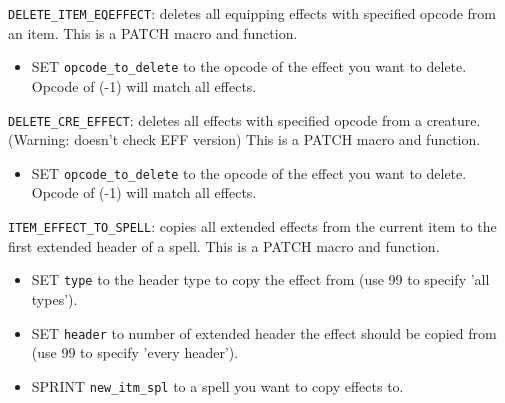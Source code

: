 \documentclass{article}
\begin{document}
\verb+DELETE_ITEM_EQEFFECT+: deletes all equipping effects with specified opcode from an item.
This is a PATCH macro and function.
\begin{itemize}
\item SET \verb+opcode_to_delete+ to the opcode of the effect you want to delete. Opcode of (-1) will match all effects.
\end{itemize}

\verb+DELETE_CRE_EFFECT+: deletes all effects with specified opcode from a creature. (Warning: doesn't check EFF version)
This is a PATCH macro and function.
\begin{itemize}
\item SET \verb+opcode_to_delete+ to the opcode of the effect you want to delete. Opcode of (-1) will match all effects.
\end{itemize}

\verb+ITEM_EFFECT_TO_SPELL+: copies all extended effects from the current item to the first extended header of a spell.
This is a PATCH macro and function.
\begin{itemize}
\item SET \verb+type+ to the header type to copy the effect from (use 99 to specify 'all types').
\item SET \verb+header+ to number of extended header the effect should be copied from (use 99 to specify 'every header').
\item SPRINT \verb+new_itm_spl+ to a spell you want to copy effects to.
\end{itemize}
\end{document}
